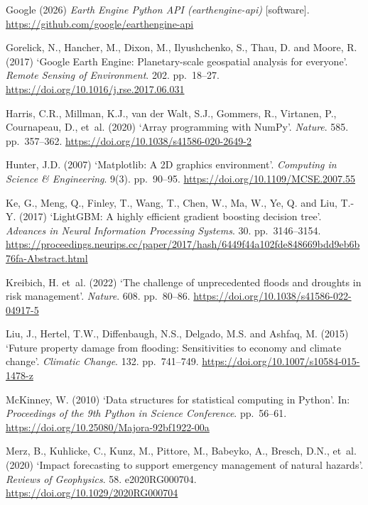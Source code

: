 \documentclass[10pt,twocolumn]{article}
\begin{document}
\begin{thebibliography}{}
Google (2026)
\textit{Earth Engine Python API (earthengine-api)} [software]. \url{https://github.com/google/earthengine-api}

Gorelick, N., Hancher, M., Dixon, M., Ilyushchenko, S., Thau, D. and Moore, R. (2017)
`Google Earth Engine: Planetary-scale geospatial analysis for everyone'.
\textit{Remote Sensing of Environment}. 202. pp.~18--27. \url{https://doi.org/10.1016/j.rse.2017.06.031}

Harris, C.R., Millman, K.J., van der Walt, S.J., Gommers, R., Virtanen, P., Cournapeau, D., et~al. (2020)
`Array programming with NumPy'.
\textit{Nature}. 585. pp.~357--362. \url{https://doi.org/10.1038/s41586-020-2649-2}

Hunter, J.D. (2007)
`Matplotlib: A 2D graphics environment'.
\textit{Computing in Science \& Engineering}. 9(3). pp.~90--95. \url{https://doi.org/10.1109/MCSE.2007.55}

Ke, G., Meng, Q., Finley, T., Wang, T., Chen, W., Ma, W., Ye, Q. and Liu, T.-Y. (2017)
`LightGBM: A highly efficient gradient boosting decision tree'.
\textit{Advances in Neural Information Processing Systems}. 30. pp.~3146--3154.
\url{https://proceedings.neurips.cc/paper/2017/hash/6449f44a102fde848669bdd9eb6b76fa-Abstract.html}

Kreibich, H. et~al. (2022)
`The challenge of unprecedented floods and droughts in risk management'.
\textit{Nature}. 608. pp.~80--86. \url{https://doi.org/10.1038/s41586-022-04917-5}

Liu, J., Hertel, T.W., Diffenbaugh, N.S., Delgado, M.S. and Ashfaq, M. (2015)
`Future property damage from flooding: Sensitivities to economy and climate change'.
\textit{Climatic Change}. 132. pp.~741--749. \url{https://doi.org/10.1007/s10584-015-1478-z}

McKinney, W. (2010)
`Data structures for statistical computing in Python'.
In: \textit{Proceedings of the 9th Python in Science Conference}. pp.~56--61.
\url{https://doi.org/10.25080/Majora-92bf1922-00a}

Merz, B., Kuhlicke, C., Kunz, M., Pittore, M., Babeyko, A., Bresch, D.N., et~al. (2020)
`Impact forecasting to support emergency management of natural hazards'.
\textit{Reviews of Geophysics}. 58. e2020RG000704. \url{https://doi.org/10.1029/2020RG000704}


\end{thebibliography}
\end{document}
